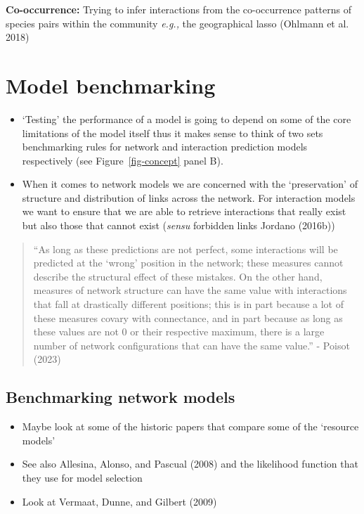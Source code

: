 \documentclass[
  letterpaper,
  DIV=11,
  numbers=noendperiod]{scrartcl}
\begin{document}
\textbf{Co-occurrence:} Trying to infer interactions from the
co-occurrence patterns of species pairs within the community
\emph{e.g.,} the geographical lasso (Ohlmann et al. 2018)

\section{Model benchmarking}\label{model-benchmarking}

\begin{itemize}
\item
  `Testing' the performance of a model is going to depend on some of the
  core limitations of the model itself thus it makes sense to think of
  two sets benchmarking rules for network and interaction prediction
  models respectively (see Figure~\ref{fig-concept} panel B).
\item
  When it comes to network models we are concerned with the
  `preservation' of structure and distribution of links across the
  network. For interaction models we want to ensure that we are able to
  retrieve interactions that really exist but also those that cannot
  exist (\emph{sensu} forbidden links Jordano (2016b))
\end{itemize}

\begin{quote}
``As long as these predictions are not perfect, some interactions will
be predicted at the `wrong' position in the network; these measures
cannot describe the structural effect of these mistakes. On the other
hand, measures of network structure can have the same value with
interactions that fall at drastically different positions; this is in
part because a lot of these measures covary with connectance, and in
part because as long as these values are not 0 or their respective
maximum, there is a large number of network configurations that can have
the same value.'' - Poisot (2023)
\end{quote}

\subsection{Benchmarking network
models}\label{benchmarking-network-models}

\begin{itemize}
\item
  Maybe look at some of the historic papers that compare some of the
  `resource models'
\item
  See also Allesina, Alonso, and Pascual (2008) and the likelihood
  function that they use for model selection
\item
  Look at Vermaat, Dunne, and Gilbert (2009)
\end{itemize}
\end{document}
